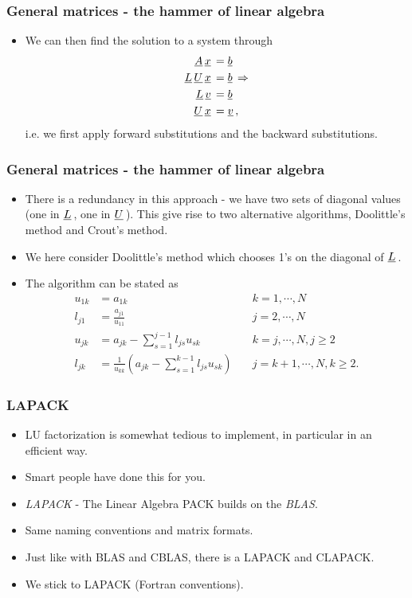 \documentclass{beamer}
\newcommand{\ub}[1]{\underbar{$#1$}\,}
\begin{document}
\begin{frame}\frametitle{General matrices - the hammer of linear algebra}
  \begin{itemize}
    \item We can then find the solution to a system through
      \[
        \begin{split}
                \ub{A}\ub{x} &= \ub{b} \\
          \ub{L}\ub{U}\ub{x} &= \ub{b} \Rightarrow \\
                \ub{L}\ub{v} &= \ub{b} \\
              \ub{U}{\ub{x}} &= \ub{v},
        \end{split}
      \]
      i.e. we first apply forward substitutions and the backward substitutions.
  \end{itemize}
\end{frame}
\begin{frame}\frametitle{General matrices - the hammer of linear algebra}
  \begin{itemize}
    \item There is a redundancy in this approach - we have two sets of diagonal values
      (one in $\ub{L}$, one in $\ub{U}$). This give rise to two alternative algorithms,
      Doolittle's method and Crout's method.
    \item We here consider Doolittle's method which chooses 1's on the diagonal of $\ub{L}$.
    \item The algorithm can be stated as
      \[
        \begin{aligned}
          u_{1k} &= a_{1k}\quad\ &k=1,\cdots,N \\
          l_{j1} &= \frac{a_{j1}}{u_{11}}\quad &j=2,\cdots,N \\
          u_{jk} &= a_{jk}-\sum_{s=1}^{j-1}l_{js}u_{sk}\quad &k=j,\cdots,N, j \geq 2 \\
          l_{jk} &= \frac{1}{u_{kk}}\left(a_{jk}-\sum_{s=1}^{k-1}l_{js}u_{sk}\right)\quad &j=k+1,\cdots,N, k \geq 2.
        \end{aligned}
      \]
  \end{itemize}
\end{frame}
\begin{frame}\frametitle{LAPACK}
  \begin{itemize}
    \item LU factorization is somewhat tedious to implement, in particular in an efficient way.
    \item Smart people have done this for you.
    \item \emph{LAPACK} - The Linear Algebra PACK builds on the \emph{BLAS}.
    \item Same naming conventions and matrix formats.
    \item Just like with BLAS and CBLAS, there is a LAPACK and CLAPACK.
    \item We stick to LAPACK (Fortran conventions).
  \end{itemize}
\end{frame}
\end{document}
